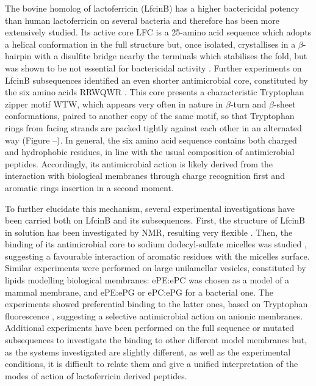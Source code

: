 The bovine homolog of lactoferricin (LfcinB) has a higher bactericidal potency than human lactoferricin on several bacteria \cite{Cochran2001} and therefore has been more extensively studied. Its active core LFC is a 25-amino acid sequence which adopts a helical conformation in the full structure but, once isolated, crystallises in a $\beta$-hairpin with a disulfite bridge nearby the terminals which stabilises the fold, but was shown to be not essential for bactericidal activity \cite{Cochran2001}.
%
Further experiments on LfcinB subsequences identified an even shorter antimicrobial core, constituted by the six amino acids RRWQWR \cite{Schibli1999}. This core presents a characteristic Tryptophan zipper motif WTW, which appears very often in nature in $\beta$-turn and $\beta$-sheet conformations, paired to another copy of the same motif, so that Tryptophan rings from facing strands are packed tightly against each other in an alternated way \cite{Cochran2001} (Figure --).
In general, the six amino acid sequence contains both charged and hydrophobic residues, in line with the usual composition of antimicrobial peptides. Accordingly, its antimicrobial action is likely derived from the interaction with biological membranes through charge recognition first and aromatic rings insertion in a second moment.

To further elucidate this mechanism, several experimental investigations have been carried both on LfcinB and its subsequences. First, the structure of LfcinB in solution has been investigated by NMR, resulting very flexible \cite{Hwang1998}. Then, the binding of its antimicrobial core to sodium dodecyl-sulfate micelles was studied \cite{Schibli1999}, suggesting a favourable interaction of aromatic residues with the micelles surface.
%
Similar experiments were performed on large unilamellar vesicles, constituted by lipids modelling biological membranes: ePE:ePC was chosen as a model of a mammal membrane, and ePE:ePG or ePC:ePG for a bacterial one. The experiments showed preferential binding to the latter ones, based on Tryptophan fluorescence \cite{Nguyen2005}, suggesting a selective antimicrobial action on anionic membranes.
%
Additional experiments have been performed on the full sequence or mutated subsequences \cite{Tsutsumi2012,Arseneault2010} to investigate the binding to other different model membranes but, as the systems investigated are slightly different, as well as the experimental conditions, it is difficult to relate them and give a unified interpretation of the modes of action of lactoferricin derived peptides.

